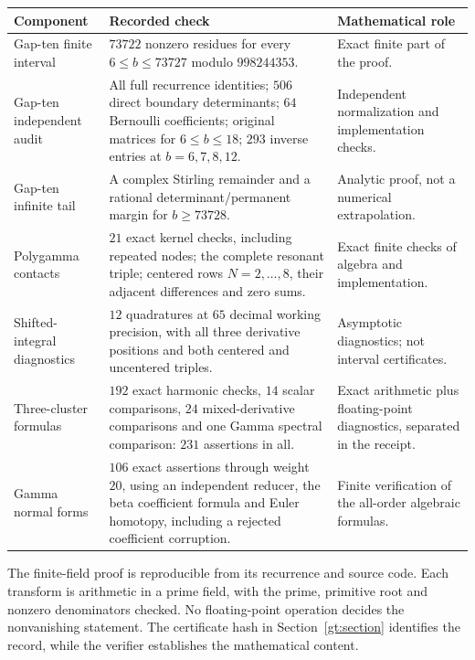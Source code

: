 \documentclass[11pt,a4paper]{article}
\theoremstyle{definition}
\theoremstyle{remark}
\numberwithin{equation}{section}
\begin{document}
\begin{longtable}{@{}>{\raggedright\arraybackslash}p{}>{\raggedright\arraybackslash}p{}>{\raggedright\arraybackslash}p{}@{}}
\toprule
Component & Recorded check & Mathematical role\\
\midrule
\endhead
Gap-ten finite interval & $73722$ nonzero residues for every
$6\le b\le73727$ modulo $998244353$. & Exact finite part of the
proof.\\[5pt]
Gap-ten independent audit & All full recurrence identities;
$506$ direct boundary determinants; $64$ Bernoulli coefficients;
original matrices for $6\le b\le18$; $293$ inverse entries at
$b=6,7,8,12$. & Independent normalization and implementation
checks.\\[5pt]
Gap-ten infinite tail & A complex Stirling remainder and a rational
determinant/permanent margin for $b\ge73728$. & Analytic proof,
not a numerical extrapolation.\\[5pt]
Polygamma contacts & $21$ exact kernel checks, including repeated
nodes; the complete resonant triple; centered rows $N=2,\ldots,8$,
their adjacent differences and zero sums. & Exact finite checks
of algebra and implementation.\\[5pt]
Shifted-integral diagnostics & $12$ quadratures at $65$ decimal
working precision, with all three derivative positions and both
centered and uncentered triples. & Asymptotic diagnostics; not
interval certificates.\\[5pt]
Three-cluster formulas & $192$ exact harmonic checks, $14$ scalar
comparisons, $24$ mixed-derivative comparisons and one Gamma
spectral comparison: $231$ assertions in all. & Exact arithmetic
plus floating-point diagnostics, separated in the receipt.\\[5pt]
Gamma normal forms & $106$ exact assertions through weight $20$,
using an independent reducer, the beta coefficient formula and
Euler homotopy, including a rejected coefficient corruption.
& Finite verification of the all-order algebraic formulas.\\
\bottomrule
\end{longtable}

The finite-field proof is reproducible from its recurrence and
source code. Each transform is arithmetic in a prime field, with
the prime, primitive root and nonzero denominators checked.
No floating-point operation decides the nonvanishing statement.
The certificate hash in Section~\ref{gt:section} identifies the
record, while the verifier establishes the mathematical content.
\end{document}
